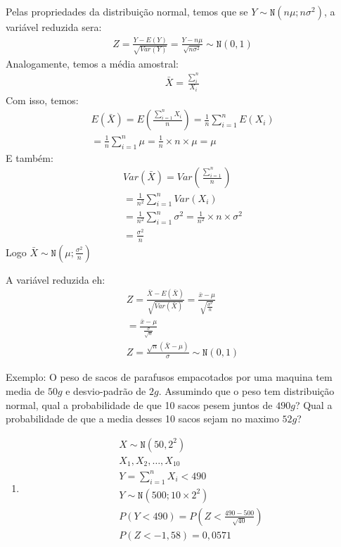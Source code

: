 \documentclass[11pt,a4paper]{book}
\begin{document}
\begin{description}
\begin{description}
  Pelas propriedades da distribuição normal, temos que se $Y\sim \mathtt{N}(n\mu; n\sigma^2)$, 
  a variável reduzida sera:
  \begin{align*}
    Z= \frac{Y- E(Y)}{\sqrt{Var(Y)}} = \frac{Y- n\mu}{\sqrt{n\sigma^2}} \sim \mathtt{N}(0,1)
  \end{align*}
  Analogamente, temos a média amostral:
  \begin{align*}
    \bar{X} = \frac{\sum_{i}^{n}}{X_i}
  \end{align*}
  Com isso, temos:
  \begin{align*}
    E(\bar{X}) = E( \frac{\sum_{i=1}^n X_i}{n} )= \frac{1}{n}\sum_{i=1}^{n} E(X_i) \\
    = \frac{1}{n} \sum_{i=1}^n \mu = \frac{1}{n} \times n \times \mu = \mu
  \end{align*}
  E também:
  \begin{align*}
    Var(\bar{X}) = Var(\frac{\sum_{i=1}^n}{n}) \\
    = \frac{1}{n^2} \sum_{i=1}^{n} Var(X_i) \\
    = \frac{1}{n^2} \sum_{i=1}^{n} \sigma^2 = \frac{1}{n^2} \times n \times \sigma^2 \\
    = \frac{\sigma^2}{n}
  \end{align*}
  Logo $\bar{X} \sim \mathtt{N} ( \mu ; \frac{\sigma^2}{n} ) $

  A variável reduzida eh:
  \begin{align*}
    Z = \frac{\bar{X}- E(\bar{X})}{\sqrt{Var(\bar{X})}} = \frac{\bar{x} - \mu}{\sqrt{\frac{\sigma^2}{n}}} \\
    = \frac{\bar{x}- \mu}{\frac{\sigma}{\sqrt{n}}} \\
    Z= \frac{\sqrt{n} (\bar{X} -\mu)}{\sigma} \sim \mathtt{N} (0,1)
  \end{align*}
\item {Exemplo:} O peso de sacos de parafusos empacotados por uma maquina tem media de $50g$ e desvio-padrão de $2g$.
  Assumindo que  o peso tem distribuição normal, qual a probabilidade de que 10 sacos pesem juntos de $490g$? 
  Qual a probabilidade de que a media desses 10 sacos sejam no maximo $52g$?

\begin{enumerate}[label=(\alph*)]
  \item
  \begin{align*}
    X \sim \mathtt{N} (50, 2^2) \\
    X_1, X_2, \ldots , X_{10 } \\
    Y= \sum_{i=1}^{n} X_i < 490 \\
    Y \sim \mathtt{N}(500 ; 10 \times 2^2) \\
    P(Y <490 ) = P(Z < \frac{490-500}{\sqrt{40}}) \\
    P(Z< -1,58) = 0,0571
  \end{align*}


\end{enumerate}
\end{description}
\end{description}
\end{document}
